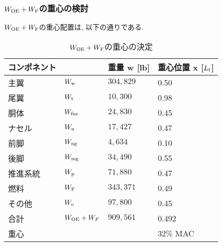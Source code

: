 \documentclass[12pt]{jsarticle}
\begin{document}
\subsubsection{$W_{\rm OE} + W_{\rm F}$の重心の検討}
$W_{\rm OE} + W_{\rm F}$の重心配置は, 以下の通りである.
\begin{table}[H]
	\caption{$W_{\rm OE} + W_{\rm F}$の重心の決定}
	\begin{center}
		\begin{tabular}{p{2cm} p{2cm} p{3cm} p{3cm}} \hline
			コンポネント  & & 重量 w [lb] & 重心位置 x [$L_{\rm f}$] \\ \hline \hline
			主翼 & $W_{\rm w}$ & $304,829$ & 0.50 \\
			尾翼 & $W_{\rm t}$ & $10,300$ & 0.98 \\
			胴体 & $W_{\rm fus}$ & $24,830$ & 0.45 \\
			ナセル & $W_{\rm n}$ & $17,427$ & 0.47 \\
			前脚 & $W_{\rm ng}$ & $4,634$ & 0.10 \\
			後脚 & $W_{\rm mg}$ & $34,490$ & 0.55 \\
			推進系統 & $W_{\rm p}$ & $71,880$ & 0.47 \\
			燃料 & $W_{\rm F}$ & $343,371$ & 0.49 \\
			その他 & $W_{\rm o}$ & $97,800$ & 0.45 \\ \hline
			合計 & $W_{\rm OE} + W_{F}$ & $909,561$ & 0.492 \\ \hline \hline
			重心 & & & 32\% MAC \\ \hline
		\end{tabular}
	\end{center}
\end{table}
\end{document}
